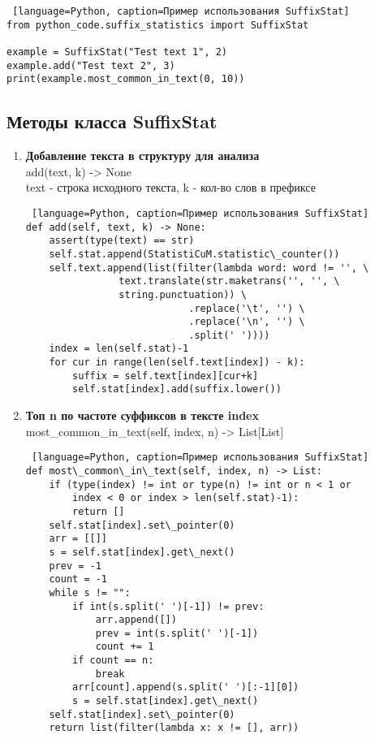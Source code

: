 \documentclass[a4paper,12pt]{article}
\begin{document}
\begin{lstlisting} [language=Python, caption=Пример использования SuffixStat]
from python_code.suffix_statistics import SuffixStat

example = SuffixStat("Test text 1", 2)
example.add("Test text 2", 3)
print(example.most_common_in_text(0, 10))
\end{lstlisting}

\subsection{Методы класса SuffixStat}

\begin{enumerate}
\item {\textbf{Добавление текста в структуру для анализа}\\
add(text, k) -> None\\
text - строка исходного текста, k - кол-во слов в префиксе}

\begin{lstlisting} [language=Python, caption=Пример использования SuffixStat]
def add(self, text, k) -> None:
    assert(type(text) == str)
    self.stat.append(StatistiCuM.statistic\_counter())
    self.text.append(list(filter(lambda word: word != '', \
	 		    text.translate(str.maketrans('', '', \ 
			    string.punctuation)) \
                            .replace('\t', '') \
                            .replace('\n', '') \
                            .split(' '))))
    index = len(self.stat)-1
    for cur in range(len(self.text[index]) - k):
        suffix = self.text[index][cur+k]
        self.stat[index].add(suffix.lower())
\end{lstlisting}

\item {\textbf{Топ n по частоте суффиксов в тексте index}\\
most\_common\_in\_text(self, index, n) -> List[List]}

\begin{lstlisting} [language=Python, caption=Пример использования SuffixStat]
def most\_common\_in\_text(self, index, n) -> List:
    if (type(index) != int or type(n) != int or n < 1 or 
        index < 0 or index > len(self.stat)-1):
        return []
    self.stat[index].set\_pointer(0)
    arr = [[]]
    s = self.stat[index].get\_next()
    prev = -1
    count = -1
    while s != "":
        if int(s.split(' ')[-1]) != prev:
            arr.append([])
            prev = int(s.split(' ')[-1])
            count += 1
        if count == n:
            break
        arr[count].append(s.split(' ')[:-1][0])
        s = self.stat[index].get\_next()
    self.stat[index].set\_pointer(0)
    return list(filter(lambda x: x != [], arr))
\end{lstlisting}


\end{enumerate}
\end{document}
